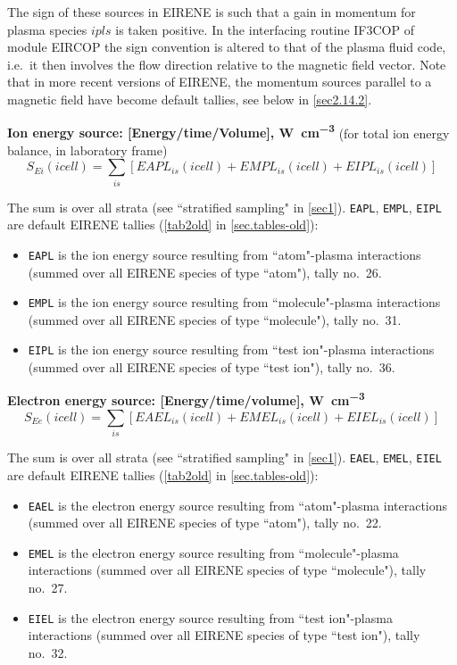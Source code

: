 The sign of these sources in EIRENE is such that a gain in momentum for plasma
species $ipls$ is taken positive.
In the interfacing routine IF3COP of module EIRCOP the sign convention is
altered to that of the plasma fluid code, i.e.\ it then involves the flow
direction relative to the magnetic field vector.
Note that in more recent versions of EIRENE, the momentum sources parallel to a
magnetic field have become default tallies, see below in \cref{sec2.14.2}.

\textbf{Ion energy source: [Energy/time/Volume],
\si{\watt\per\cubic\centi\metre}} (for total ion energy balance, in laboratory
frame)
\begin{equation}
  S_{Ei}(icell) = \sum_{is} \left[EAPL_{is}(icell) +
    EMPL_{is}(icell) + EIPL_{is}(icell) \right]
\end{equation}

The sum is over all strata (see  ``stratified sampling" in \cref{sec1}).
\lstinline|EAPL|, \lstinline|EMPL|, \lstinline|EIPL| are
default EIRENE tallies (\cref{tab2old} in \cref{sec.tables-old}):
\begin{itemize}
  \item \lstinline|EAPL| is the ion energy source	resulting from
        ``atom"-plasma interactions (summed over all EIRENE species of type ``atom"),
        tally no.\ 26.
  \item \lstinline|EMPL| is the ion energy source	resulting from
        ``molecule"-plasma interactions (summed over all EIRENE species of type
        ``molecule"), tally no.\ 31.
  \item \lstinline|EIPL| is the ion energy source	resulting from ``test
        ion"-plasma interactions (summed over all EIRENE species of type ``test ion"),
        tally no.\ 36.
\end{itemize}

\textbf{Electron energy source: [Energy/time/volume],
\si{\watt\per\cubic\centi\metre}}
\begin{equation}
  S_{Ee}(icell) = \sum_{is}
  \left[EAEL_{is}(icell) + EMEL_{is}(icell) + EIEL_{is}(icell) \right]
\end{equation}

The sum is over all strata (see  ``stratified sampling" in \cref{sec1}).
\lstinline|EAEL|, \lstinline|EMEL|,  \lstinline|EIEL| are
default EIRENE tallies (\cref{tab2old} in \cref{sec.tables-old}):
\begin{itemize}
  \item  \lstinline|EAEL| is the electron energy source	resulting from
        ``atom"-plasma interactions (summed over all EIRENE species of type ``atom"),
        tally no.\ 22.
  \item  \lstinline|EMEL| is the electron energy source	resulting from
        ``molecule"-plasma interactions (summed over all EIRENE species of type
        ``molecule"), tally no.\ 27.
  \item  \lstinline|EIEL| is the electron energy source	resulting from
        ``test ion"-plasma interactions (summed over all EIRENE species of type ``test
        ion"), tally no.\ 32.
\end{itemize}

